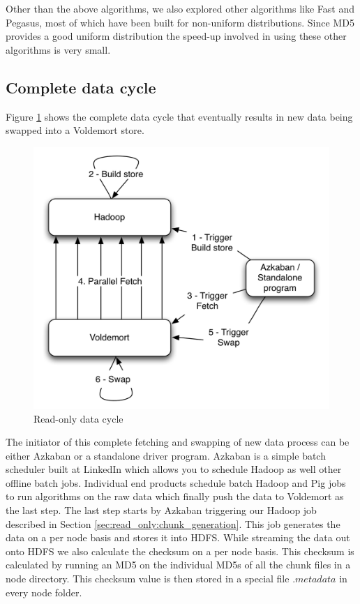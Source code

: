 \documentclass[10pt,twocolumn,preprint,natbib,authoryear]{sigplanconf}
\begin{document}
Other than the above algorithms, we also explored other algorithms like Fast and Pegasus, most of which have been built for non-uniform distributions. Since MD5 provides a good uniform distribution the speed-up involved in using these other algorithms is very small. 


\subsection{Complete data cycle}
\label{sec:read_only:data_cycle}

Figure \ref{cycle} shows the complete data cycle that eventually results in new data being swapped into a Voldemort store. 

\begin{figure}
  \centering
    \includegraphics[scale=0.60]{cycle.png}
  \caption{Read-only data cycle}
  \label{cycle}
\end{figure}

The initiator of this complete fetching and swapping of new data process can be either Azkaban or a standalone driver program. Azkaban\cite{azkaban} is a simple batch scheduler built at LinkedIn which allows you to schedule Hadoop as well other offline batch jobs. Individual end products schedule batch Hadoop and Pig jobs to run algorithms on the raw data which finally push the data to Voldemort as the last step. The last step starts by Azkaban triggering our Hadoop job described in Section \ref{sec:read_only:chunk_generation}. This job generates the data on a per node basis and stores it into HDFS. While streaming the data out onto HDFS we also calculate the checksum on a per node basis. This checksum is calculated by running an MD5 on the individual MD5s of all the chunk files in a node directory. This checksum value is then stored in a special file $.metadata$ in every node folder. 
\end{document}
